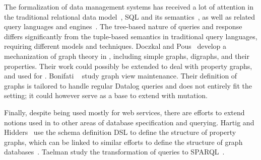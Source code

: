 The formalization of data management systems has received a lot of attention in the traditional 
relational data model~\cite{relationalcoq}, SQL and its semantics~\cite{sqlequiv, hottsql, vesqlengines, vesqlsemantics}, as well as related query languages and engines~\cite{certifdatalog}. The tree-based nature of \gql queries and response differs significantly from the tuple-based semantics in traditional query languages, requiring different models and techniques.
Doczkal and Pous~\cite{graphtheory} develop a mechanization of graph theory in \coq, including simple graphs, digraphs, and their properties. Their work could possibly be extended to deal with property graphs, and used for \gcoql.
Bonifati \etal~\cite{graphviewmaint} study graph view maintenance. Their definition of graphs is tailored to handle regular Datalog queries and does not entirely fit the \gql setting; it could however serve as a base to extend \gcoql with mutation.


Finally, despite being used mostly for web services, there are efforts to extend notions used in \gql to other areas of database specification and querying. Hartig and Hidders~\cite{olafschema} use the \gql schema definition DSL to define the structure of property graphs, which can be linked to similar efforts to define the structure of graph databases~\cite{schemaval}. Taelman \etal study the transformation of \gql queries to SPARQL~\cite{gqlsparql}.


